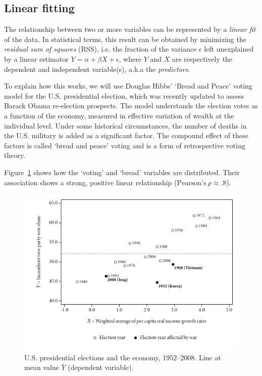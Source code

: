 	\subsection{Linear fitting}

  The relationship between two or more variables can be represented by a \emph{linear fit} of the data. In statistical terms, this result can be obtained by minimizing the \emph{residual sum of squares} (RSS), i.e. the fraction of the variance $\epsilon$ left unexplained by a linear estimator $Y = \alpha + \beta X + \epsilon$, where $Y$ and $X$ are respectively the dependent and independent variable(s), a.k.a the \emph{predictors}.

  To explain how this works, we will use Douglas Hibbs' `Bread and Peace' voting model for the U.S. presidential election, which was recently updated to assess Barack Obama re-election prospects.\cite{Hibbs:2012a} The model understands the election votes as a function of the economy, measured in effective variation of wealth at the individual level. Under some historical circumstances, the number of deaths in the U.S. military is added as a significant factor. The compound effect of these factors is called `bread and peace' voting and is a form of retrospective voting theory.

  Figure~\ref{fig:hibbs_data} shows how the `voting' and `bread' variables are distributed. Their association shows a strong, positive linear relationship ($\text{Pearson's}~\rho \approx .8$).

  \begin{figure}[htp]
  	\includegraphics[width=.9\textwidth]{images/hibbs1.pdf}

  	\caption[U.S. presidential elections]{\label{fig:hibbs_data}
  	U.S. presidential elections and the economy, 1952--2008. %
  	Line at mean value $\bar Y$ (dependent variable). %
    \hibbs}
  \end{figure}%

